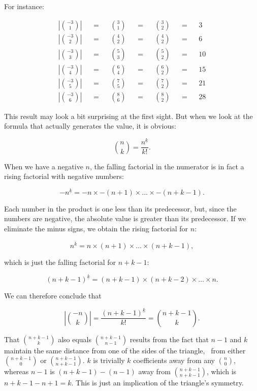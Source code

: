 \documentclass[tikz]{scrreprt}
\begin{document}
For instance:

\begin{align*}
\left\lvert\binom{-3}{1}\right\rvert &&=&&\binom{3}{1} &&=&&\binom{3}{2} &&=&& 3\\
\left\lvert\binom{-3}{2}\right\rvert &&=&&\binom{4}{2} &&=&&\binom{4}{2} &&=&& 6\\
\left\lvert\binom{-3}{3}\right\rvert &&=&&\binom{5}{3} &&=&&\binom{5}{2} &&=&& 10\\
\left\lvert\binom{-3}{4}\right\rvert &&=&&\binom{6}{4} &&=&&\binom{6}{2} &&=&& 15\\
\left\lvert\binom{-3}{5}\right\rvert &&=&&\binom{7}{5} &&=&&\binom{7}{2} &&=&& 21\\
\left\lvert\binom{-3}{6}\right\rvert &&=&&\binom{8}{6} &&=&&\binom{8}{2} &&=&& 28
\end{align*}

This result may look a bit surprising at the first sight.
But when we look at the formula that actually generates
the value, it is obvious:

\begin{equation}
\binom{n}{k} = \frac{n^{\underline{k}}}{k!}.
\end{equation}

When we have a negative $n$, the falling factorial
in the numerator is in fact a rising factorial with
negative numbers:

\[
-n^{\underline{k}} = -n \times -(n+1) \times \dots \times -(n+k-1).
\]

Each number in the product is one less than its predecessor,
but, since the numbers are negative, the absolute value
is greater than its predecessor.
If we eliminate the minus signs, we obtain the rising factorial
for $n$:

\[
n^{\overline{k}} = n \times (n+1) \times \dots \times (n+k-1),
\]

which is just the falling factorial for $n+k-1$:

\[
(n+k-1)^{\underline{k}} = (n+k-1) \times (n+k-2) \times \dots \times n.
\]

We can therefore conclude that

\begin{equation}
\left\lvert\binom{-n}{k}\right\rvert = 
\frac{(n+k-1)^{\underline{k}}}{k!} = \binom{n+k-1}{k}.
\end{equation}

That $\binom{n+k-1}{k}$ also equals
$\binom{n+k-1}{n-1}$ results from the fact
that $n-1$ and $k$ maintain the same distance
from one of the sides of the triangle,
\ie\ from either $\binom{n+k-1}{0}$ or $\binom{n+k-1}{n+k-1}$.
$k$ is trivially $k$ coefficients away from any $\binom{n}{0}$,
whereas $n-1$ is $(n+k-1) - (n-1)$ away from $\binom{n+k-1}{n+k-1}$,
which is $n+k-1-n+1=k$. This is just an implication
of the triangle's symmetry.
\end{document}
